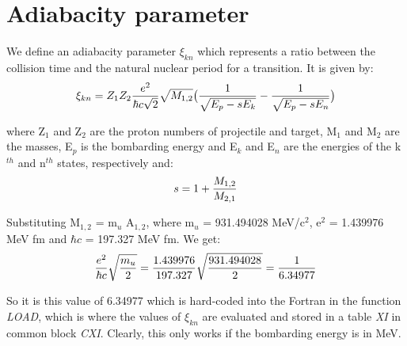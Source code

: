 \chapter{Adiabacity parameter}
\label{chapt:adiabacity}

We define an adiabacity parameter $\xi_{kn}$ which represents a ratio
between the collision time and the natural nuclear period for a transition.
It is given by:\\

\begin{equation}
\xi_{kn} = Z_1 Z_2 {e^2 \over \hbar c \sqrt{2}}  \sqrt{M_{1,2}}
\big(
{1 \over \sqrt{E_p -s E_k}} - {1 \over \sqrt{E_p -s E_n}}
\big)
\end{equation}

where Z$_1$ and Z$_2$ are the proton numbers of projectile and target, M$_1$
and M$_2$ are the masses, E$_p$ is the bombarding energy and E$_k$ and E$_n$
are the energies of the k$^{th}$ and n$^{th}$ states, respectively and:\\

\begin{equation}
s = 1 + {M_{1,2} \over M_{2,1}}
\end{equation}

Substituting M$_{1,2}$ = m$_u$ A$_{1,2}$, where m$_u$ = 931.494028
MeV/c$^2$, e$^2$ = 1.439976 MeV fm and $\hbar c$ = 197.327 MeV fm. We get:\\

\begin{equation}
{e^2 \over \hbar c}\sqrt{m_u \over 2} = {1.439976 \over 197.327}
\sqrt{931.494028 \over 2} = {1 \over 6.34977}
\end{equation}

So it is this value of 6.34977 which is hard-coded into the Fortran in the
function \emph{LOAD}, which is where the values of $\xi_{kn}$ are evaluated
and stored in a table \emph{XI} in common block \emph{CXI}. Clearly, this only
works if the bombarding energy is in MeV.\\

